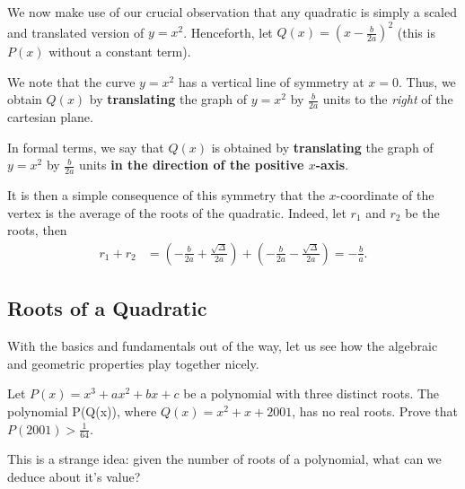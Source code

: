 \documentclass[../jarvis.tex]{subfiles}
\begin{document}
We now make use of our crucial observation that any quadratic is simply a scaled and translated version of $y=x^2$. Henceforth, let $Q(x)=\left(x-\frac{b}{2a}\right)^2$ (this is $P(x)$ without a constant term).

We note that the curve $y=x^2$ has a vertical line of symmetry at $x=0$. Thus, we obtain $Q(x)$ by \textbf{translating} the graph of $y=x^2$ by $\frac{b}{2a}$ units to the \textit{right} of the cartesian plane.

In formal terms, we say that $Q(x)$ is obtained by \textbf{translating} the graph of $y=x^2$ by $\frac{b}{2a}$ units \textbf{in the direction of the positive $x$-axis}. 

It is then a simple consequence of this symmetry that the $x$-coordinate of the vertex is the average of the roots of the quadratic. Indeed, let $r_1$ and $r_2$ be the roots, then
\begin{align*}
    r_1+r_2&=\left(-\frac{b}{2a}+\frac{\sqrt{\Delta}}{2a}\right)+\left(-\frac{b}{2a}-\frac{\sqrt{\Delta}}{2a}\right)=-\frac{b}{a}.
\end{align*}
\subsection{Roots of a Quadratic \ez}
With the basics and fundamentals out of the way, let us see how the algebraic and geometric properties play together nicely.
\begin{example}[2010-2011 Mandelbrot]
    Let $P(x)=x^3+ax^2+bx+c$ be a polynomial with three distinct roots. The polynomial P(Q(x)), where $Q(x)=x^2+x+2001$, has no real roots. Prove that $P(2001)>\frac{1}{64}$.
\end{example}
This is a strange idea: given the number of roots of a polynomial, what can we deduce about it's value?
\end{document}

